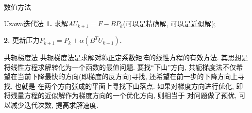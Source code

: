 \documentclass{article}
\begin{document}
\begin{section}{数值方法}
\begin{subsection}{Uzawa迭代法}
        \noindent\textbf{1.} 求解$AU_{k+1}=F-BP_k$(可以是精确解, 可以是近似解);

        \noindent\textbf{2.} 更新压力$P_{k+1} = P_k + \alpha(B^TU_{k+1})$.
    
    \end{subsection}
    \begin{subsection}{共轭梯度法}
        共轭梯度法是求解对称正定系数矩阵的线性方程的有效方法. 其思想是将线性方程求解转化为一个函数的最值问题. 
        要找“下山”方向, 共轭梯度法不仅希望在当前下降最快的方向(即梯度的反方向)寻找, 还希望在前一步的下降方向上寻找, 也就是
        在两个方向张成的平面上寻找下山落点. 如果对梯度方向进行优化, 即将残量方程的近似解作为梯度方向的一个优化方向, 则相当于
        对问题做了预优, 可以减少迭代次数, 提高求解速度. 
    \end{subsection}
\end{section}
\end{document}
